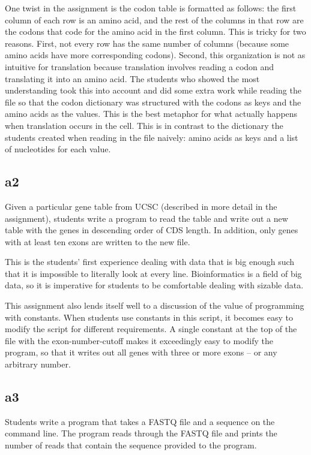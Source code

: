 \documentclass{report}
\begin{document}
One twist in the assignment is the codon table is formatted as follows: the first column of each row is an amino acid, and the rest of the columns in that row are the codons that code for the amino acid in the first column. This is tricky for two reasons. First, not every row has the same number of columns (because some amino acids have more corresponding codons). Second, this organization is not as intuitive for translation because translation involves reading a codon and translating it into an amino acid. The students who showed the most understanding took this into account and did some extra work while reading the file so that the codon dictionary was structured with the codons as keys and the amino acids as the values. This is the best metaphor for what actually happens when translation occurs in the cell. This is in contrast to the dictionary the students created when reading in the file naively: amino acids as keys and a list of nucleotides for each value.

\subsection{a2}
Given a particular gene table from UCSC \cite{karolchik2003ucsc} (described in more detail in the assignment), students write a program to read the table and write out a new table with the genes in descending order of CDS length. In addition, only genes with at least ten exons are written to the new file. 

This is the students' first experience dealing with data that is big enough such that it is impossible to literally look at every line. Bioinformatics is a field of big data, so it is imperative for students to be comfortable dealing with sizable data.

This assignment also lends itself well to a discussion of the value of programming with constants. When students use constants in this script, it becomes easy to modify the script for different requirements. A single constant at the top of the file with the exon-number-cutoff makes it exceedingly easy to modify the program, so that it writes out all genes with three or more exons -- or any arbitrary number.

\subsection{a3}
Students write a program that takes a FASTQ file and a sequence on the command line. The program reads through the FASTQ file and prints the number of reads that contain the sequence provided to the program.
\end{document}
